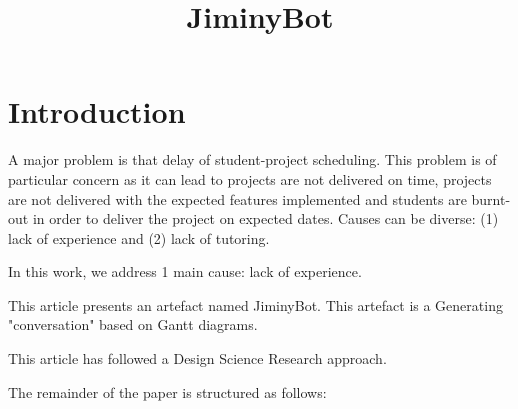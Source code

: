 \documentclass{article}
\title{JiminyBot}
\author{}
\begin{document}
\maketitle
      

\section{Introduction}


    
A major problem is that delay of student-project scheduling. This problem is of particular concern as it can lead to projects are not delivered on time, projects are not delivered with the expected features implemented and students are burnt-out in order to deliver the project on expected dates. Causes can be diverse: (1) lack of experience and (2) lack of tutoring. 
    

    
In this work, we address 1 main cause: lack of experience. 
    
This article presents an artefact named JiminyBot. This artefact is a Generating "conversation" based on Gantt diagrams. 
    

    

      
This article has followed a Design Science Research approach.

The remainder of the paper is structured as follows: 

    
      


\end{document}
